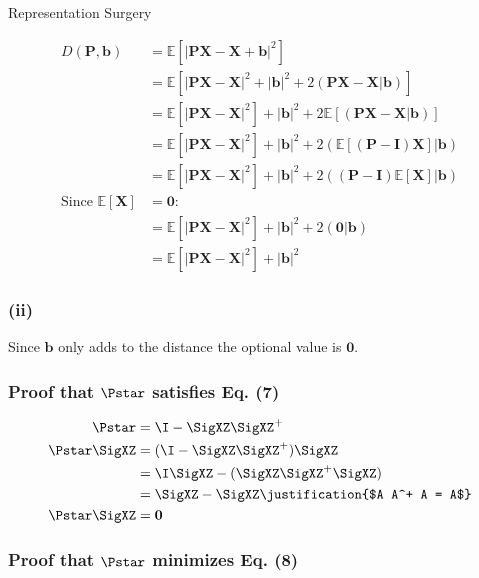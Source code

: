 \begin{question}{Representation Surgery}
\begin{subquestion}
\begin{align*}
D(\mathbf{P}, \mathbf{b}) &= \mathbb{E}[|\mathbf{P}\mathbf{X} - \mathbf{X} + \mathbf{b}|^2] \\
&= \mathbb{E}[|\mathbf{P}\mathbf{X} - \mathbf{X}|^2 + |\mathbf{b}|^2 + 2(\mathbf{P}\mathbf{X} - \mathbf{X} | \mathbf{b})] \\
&= \mathbb{E}[|\mathbf{P}\mathbf{X} - \mathbf{X}|^2] + |\mathbf{b}|^2 + 2\mathbb{E}[(\mathbf{P}\mathbf{X} - \mathbf{X} | \mathbf{b})] \\
&= \mathbb{E}[|\mathbf{P}\mathbf{X} - \mathbf{X}|^2] + |\mathbf{b}|^2 + 2(\mathbb{E}[(\mathbf{P} - \mathbf{I})\mathbf{X}] | \mathbf{b}) \\
&= \mathbb{E}[|\mathbf{P}\mathbf{X} - \mathbf{X}|^2] + |\mathbf{b}|^2 + 2((\mathbf{P} - \mathbf{I})\mathbb{E}[\mathbf{X}] | \mathbf{b}) \\
\text{Since } \mathbb{E}[\mathbf{X}] &= \mathbf{0}: \\
&= \mathbb{E}[|\mathbf{P}\mathbf{X} - \mathbf{X}|^2] + |\mathbf{b}|^2 + 2(\mathbf{0} | \mathbf{b}) \\
&= \mathbb{E}[|\mathbf{P}\mathbf{X} - \mathbf{X}|^2] + |\mathbf{b}|^2
\end{align*}

\subsubsection*{(ii)}

Since $\mathbf{b}$ only adds to the distance the optional value is $\mathbf{0}$.

\end{subquestion}

\begin{subquestion}
\subsubsection*{Proof that $\Pstar$ satisfies Eq. (7)}
\begin{align*}
           \Pstar &= \I - \SigXZ \SigXZ^{+} \\
    \Pstar \SigXZ &= (\I - \SigXZ \SigXZ^{+}) \SigXZ \\
                  &= \I \SigXZ - (\SigXZ \SigXZ^{+} \SigXZ) \\
                  &= \SigXZ - \SigXZ \justification{$A A^+ A = A$} \\
    \Pstar \SigXZ &= \mathbf{0}
\end{align*}
\subsubsection*{Proof that $\Pstar$ minimizes Eq. (8)}
\end{subquestion}

\begin{subquestion}

\end{subquestion}

\end{question}